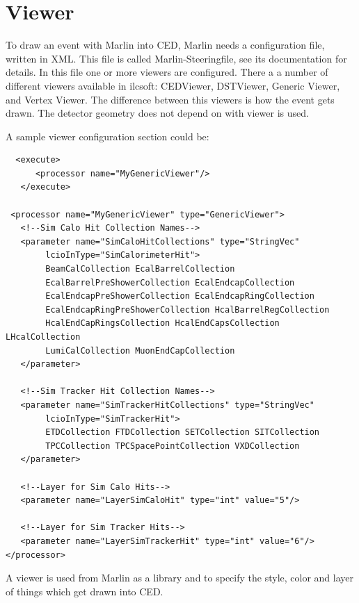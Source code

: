 \documentclass[a4paper,10pt]{article}
\begin{document}

\section{Viewer}
To draw an event with Marlin into CED, Marlin needs a configuration file, written in XML. This file is called Marlin-Steeringfile, see its documentation for details. In this file one or more viewers are configured. There a a number of different viewers available in ilcsoft: CEDViewer, DSTViewer, Generic Viewer, and Vertex Viewer. The difference between this viewers is how the event gets drawn. The detector geometry does not depend on with viewer is used. 

A sample viewer configuration section could be:
 \begin{verbatim}
  <execute>
      <processor name="MyGenericViewer"/>
   </execute>

 <processor name="MyGenericViewer" type="GenericViewer">
   <!--Sim Calo Hit Collection Names-->
   <parameter name="SimCaloHitCollections" type="StringVec"
        lcioInType="SimCalorimeterHit"> 
        BeamCalCollection EcalBarrelCollection
        EcalBarrelPreShowerCollection EcalEndcapCollection 
        EcalEndcapPreShowerCollection EcalEndcapRingCollection 
        EcalEndcapRingPreShowerCollection HcalBarrelRegCollection 
        HcalEndCapRingsCollection HcalEndCapsCollection LHcalCollection 
        LumiCalCollection MuonEndCapCollection 
   </parameter>
   
   <!--Sim Tracker Hit Collection Names-->
   <parameter name="SimTrackerHitCollections" type="StringVec" 
        lcioInType="SimTrackerHit"> 
        ETDCollection FTDCollection SETCollection SITCollection 
        TPCCollection TPCSpacePointCollection VXDCollection 
   </parameter>

   <!--Layer for Sim Calo Hits-->
   <parameter name="LayerSimCaloHit" type="int" value="5"/>
   
   <!--Layer for Sim Tracker Hits-->
   <parameter name="LayerSimTrackerHit" type="int" value="6"/>
</processor>

 \end{verbatim}
A viewer is used from Marlin as a library and to specify the style, color and layer of things which get drawn into CED.
\end{document}
